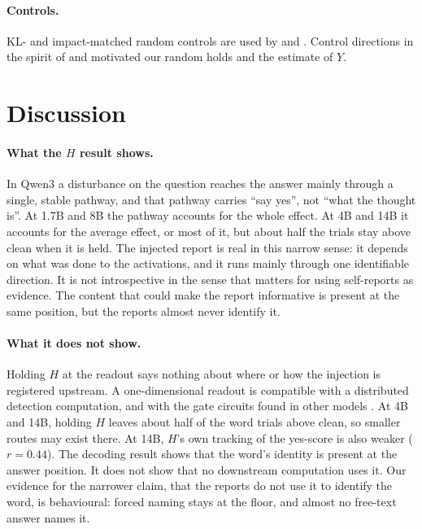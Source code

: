 \documentclass[11pt]{article}
\newcommand{\ys}{yes-score}
\begin{document}
\paragraph{Controls.} KL- and impact-matched random controls are used by \citet{luo2026steercheck} and \citet{ferrara2026owmi}. Control directions in the spirit of \citet{hewitt2019control} and \citet{adebayo2018sanity} motivated our random holds and the estimate of $Y$.

\section{Discussion}

\paragraph{What the $H$ result shows.} In Qwen3 a disturbance on the question reaches the answer mainly through a single, stable pathway, and that pathway carries ``say yes'', not ``what the thought is''. At 1.7B and 8B the pathway accounts for the whole effect. At 4B and 14B it accounts for the average effect, or most of it, but about half the trials stay above clean when it is held. The injected report is real in this narrow sense: it depends on what was done to the activations, and it runs mainly through one identifiable direction. It is not introspective in the sense that matters for using self-reports as evidence. The content that could make the report informative is present at the same position, but the reports almost never identify it.

\paragraph{What it does not show.} Holding $H$ at the readout says nothing about where or how the injection is registered upstream. A one-dimensional readout is compatible with a distributed detection computation, and with the gate circuits found in other models \citep{macar2026mechanisms,zou2026mechanistic}. At 4B and 14B, holding $H$ leaves about half of the word trials above clean, so smaller routes may exist there. At 14B, $H$'s own tracking of the \ys{} is also weaker ($r=0.44$). The decoding result shows that the word's identity is present at the answer position. It does not show that no downstream computation uses it. Our evidence for the narrower claim, that the reports do not use it to identify the word, is behavioural: forced naming stays at the floor, and almost no free-text answer names it.
\end{document}
